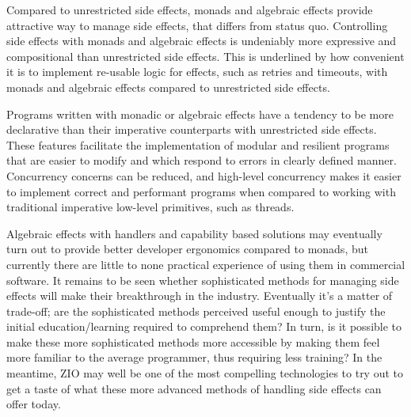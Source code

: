 Compared to unrestricted side effects, monads and algebraic effects provide attractive way to manage side effects, that differs from status quo. Controlling side effects with monads and algebraic effects is undeniably more expressive and compositional than unrestricted side effects. This is underlined by how convenient it is to implement re-usable logic for effects, such as retries and timeouts, with monads and algebraic effects compared to unrestricted side effects.

Programs written with monadic or algebraic effects have a tendency to be more declarative than their imperative counterparts with unrestricted side effects. These features facilitate the implementation of modular and resilient programs that are easier to modify and  which respond to errors in clearly defined manner. Concurrency concerns can be reduced, and high-level concurrency makes it easier to implement correct and performant programs when compared to working with traditional imperative low-level primitives, such as threads.


Algebraic effects with handlers and capability based solutions may eventually turn out to provide better developer ergonomics compared to monads, but currently there are little to none practical experience of using them in commercial software. It remains to be seen whether sophisticated methods for managing side effects will make their breakthrough in the industry. Eventually it's a matter of trade-off; are the sophisticated methods perceived useful enough to justify the initial education/learning required to comprehend them? In turn, is it possible to make these more sophisticated methods more accessible by making them feel more familiar to the average programmer, thus requiring less training? In the meantime, ZIO may well be one of the most compelling technologies to try out to get a taste of what these more advanced methods of handling side effects can offer today.




